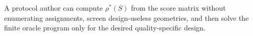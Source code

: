 A protocol author can compute \(\rho^*(S)\) from the score matrix without enumerating assignments, screen design-useless geometries, and then solve the finite oracle program only for the desired quality-specific design.